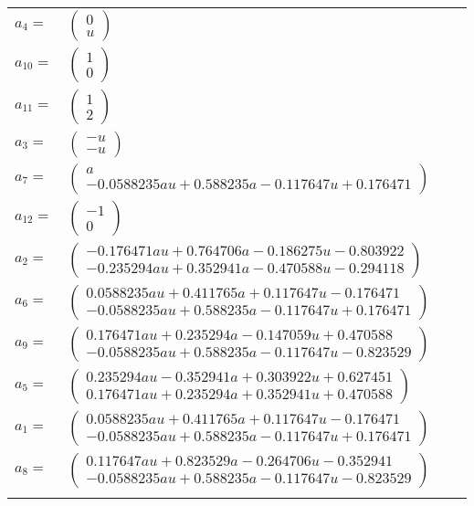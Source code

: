 \documentclass[1p]{elsarticle_modified}
\theoremstyle{definition}
\begin{document}
\begin{tabular}{m{7pt} m{180pt} m{7pt} m{180pt} }
\flushright $a_{4}=$&$\begin{pmatrix}0\\u\end{pmatrix}$ \\
\flushright $a_{10}=$&$\begin{pmatrix}1\\0\end{pmatrix}$ \\
\flushright $a_{11}=$&$\begin{pmatrix}1\\2\end{pmatrix}$ \\
\flushright $a_{3}=$&$\begin{pmatrix}- u\\- u\end{pmatrix}$ \\
\flushright $a_{7}=$&$\begin{pmatrix}a\\-0.0588235 a u+0.588235 a-0.117647 u+0.176471\end{pmatrix}$ \\
\flushright $a_{12}=$&$\begin{pmatrix}-1\\0\end{pmatrix}$ \\
\flushright $a_{2}=$&$\begin{pmatrix}-0.176471 a u+0.764706 a-0.186275 u-0.803922\\-0.235294 a u+0.352941 a-0.470588 u-0.294118\end{pmatrix}$ \\
\flushright $a_{6}=$&$\begin{pmatrix}0.0588235 a u+0.411765 a+0.117647 u-0.176471\\-0.0588235 a u+0.588235 a-0.117647 u+0.176471\end{pmatrix}$ \\
\flushright $a_{9}=$&$\begin{pmatrix}0.176471 a u+0.235294 a-0.147059 u+0.470588\\-0.0588235 a u+0.588235 a-0.117647 u-0.823529\end{pmatrix}$ \\
\flushright $a_{5}=$&$\begin{pmatrix}0.235294 a u-0.352941 a+0.303922 u+0.627451\\0.176471 a u+0.235294 a+0.352941 u+0.470588\end{pmatrix}$ \\
\flushright $a_{1}=$&$\begin{pmatrix}0.0588235 a u+0.411765 a+0.117647 u-0.176471\\-0.0588235 a u+0.588235 a-0.117647 u+0.176471\end{pmatrix}$ \\
\flushright $a_{8}=$&$\begin{pmatrix}0.117647 a u+0.823529 a-0.264706 u-0.352941\\-0.0588235 a u+0.588235 a-0.117647 u-0.823529\end{pmatrix}$\\&\end{tabular}
\end{document}
